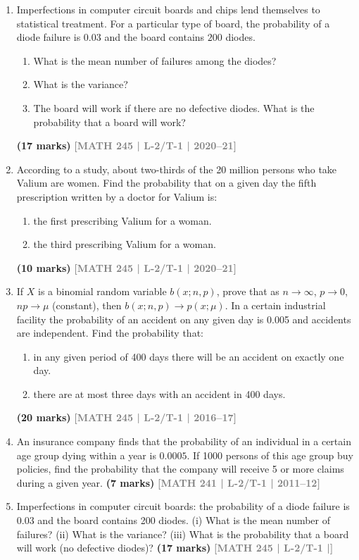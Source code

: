 \documentclass[12pt,a4paper]{article}
\newcommand{\yr}[1]{\hfill\textcolor{gray}{\small\textbf{[#1]}}}
\newcommand{\mk}[1]{\textcolor{orange!70!black}{\small\textbf{(#1 marks)}}}
\begin{document}
\begin{enumerate}\item Imperfections in computer circuit boards and chips lend themselves to statistical treatment. For a particular type of board, the probability of a diode failure is $0.03$ and the board contains $200$ diodes.
\begin{enumerate}
  \item What is the mean number of failures among the diodes?
  \item What is the variance?
  \item The board will work if there are no defective diodes. What is the probability that a board will work?
\end{enumerate}
\mk{17} \yr{MATH 245 | L-2/T-1 | 2020--21}

\item According to a study, about two-thirds of the 20 million persons who take Valium are women. Find the probability that on a given day the fifth prescription written by a doctor for Valium is:
\begin{enumerate}
  \item the first prescribing Valium for a woman.
  \item the third prescribing Valium for a woman.
\end{enumerate}
\mk{10} \yr{MATH 245 | L-2/T-1 | 2020--21}

\item If $X$ is a binomial random variable $b(x;n,p)$, prove that as $n\to\infty$, $p\to 0$, $np\to\mu$ (constant), then $b(x;n,p)\to p(x;\mu)$. In a certain industrial facility the probability of an accident on any given day is 0.005 and accidents are independent. Find the probability that:
\begin{enumerate}
  \item in any given period of 400 days there will be an accident on exactly one day.
  \item there are at most three days with an accident in 400 days.
\end{enumerate}
\mk{20} \yr{MATH 245 | L-2/T-1 | 2016--17}

\item An insurance company finds that the probability of an individual in a certain age group dying within a year is $0.0005$. If 1000 persons of this age group buy policies, find the probability that the company will receive 5 or more claims during a given year.
\mk{7} \yr{MATH 241 | L-2/T-1 | 2011--12}

\item Imperfections in computer circuit boards: the probability of a diode failure is 0.03 and the board contains 200 diodes. (i) What is the mean number of failures? (ii) What is the variance? (iii) What is the probability that a board will work (no defective diodes)?
\mk{17} \yr{MATH 245 | L-2/T-1 |}

\end{enumerate}
\end{document}
